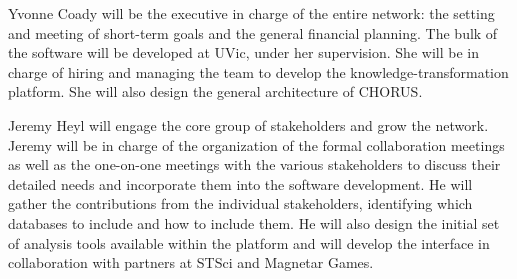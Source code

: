 Yvonne Coady will be the executive in charge of the entire network:
the setting and meeting of short-term goals and the general financial
planning.  The bulk of the software will be developed at UVic, under
her supervision. She will be in charge of hiring and managing the team
to develop the knowledge-transformation platform. She will also design
the general architecture of CHORUS.

Jeremy Heyl will engage the core group of stakeholders and grow the
network.  Jeremy will be in charge of the organization of the formal
collaboration meetings as well as the one-on-one meetings with the
various stakeholders to discuss their detailed needs and incorporate
them into the software development. He will gather the contributions
from the individual stakeholders, identifying which databases to
include and how to include them.  He will also design the initial set
of analysis tools available within the platform and will develop the
interface in collaboration with partners at STSci and Magnetar Games.
 
